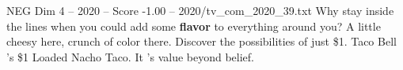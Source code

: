 \begin{textsample}{NEG Dim 4 – 2020 – Score -1.00 – 2020/tv\_com\_2020\_39.txt}  \label{ex:f4_neg_063}
Why stay inside the lines when you could add some \textbf{flavor} to everything around you?
A little cheesy here, crunch of color there.
Discover the possibilities of just \$1.
Taco Bell 's \$1 Loaded Nacho Taco.
It 's value beyond belief.

\end{textsample}
